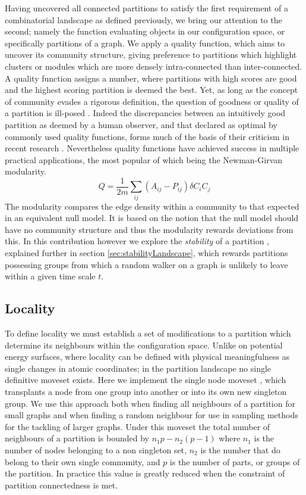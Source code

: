 Having uncovered all connected partitions to satisfy the first requirement of a combinatorial landscape as defined previously, we bring our attention to the second; namely the function evaluating objects in our configuration space, or specifically partitions of a graph.  We apply a quality function, which aims to uncover its community structure, giving preference to partitions which highlight clusters or modules which are more densely intra-connected than inter-connected.  A quality function assigns a number, where partitions with high scores are good and the highest scoring partition is deemed the best.  Yet, as long as the concept of community evades a rigorous definition, the question of goodness or quality of a partition is ill-posed \cite{Fortunato}.  Indeed the discrepancies between an intuitively good partition as deemed by a human observer, and that declared as optimal by commonly used quality functions, forms much of the basis of their criticism in recent research \cite{Good2010}.  Nevertheless quality functions have achieved success in multiple practical applications, the most popular of which being the Newman-Girvan modularity\cite{Newman2004}. 
\[ 
Q = \frac{1}{2m}\sum_{ij}(A_{ij}- P_{ij})\delta C_iC_j
\]
The modularity compares the edge density within a community to that expected in an equivalent null model. It is based on the notion that the null model should have no community structure and thus the modularity rewards deviations from this.  In this contribution however we explore the \textit{stability} of a partition \cite{Lambiotte2009}\cite{Delvenne2010a}, explained further in section \ref{sec:stabilityLandscape}, which rewards partitions possessing groups from which a random walker on a graph is unlikely to leave within a given time scale $t$.

\subsection*{Locality}
To define locality we must establish a set of modifications to a partition which determine its neighbours within the configuration space.  Unlike on potential energy surfaces, where locality can be defined with physical meaningfulness as single changes in atomic coordinates; in the partition landscape no single definitive moveset exists.  Here we implement the single node moveset \cite{Good2010}, which transplants a node from one group into another or into its own new singleton group.  We use this approach both when finding all neighbours of a partition for small graphs and when finding a random neighbour for use in sampling methods for the tackling of larger graphs.  Under this moveset the total number of neighbours of a partition is bounded by $n_1p-n_2(p-1)$ where $n_1$ is the number of nodes belonging to a non singleton set, $n_2$ is the number that do belong to their own single community, and $p$ is the number of parts, or groups of the partition.  In practice this value is greatly reduced when the constraint of partition connectedness is met.

